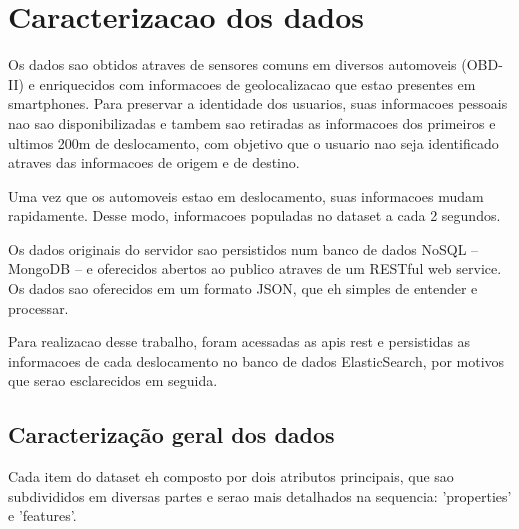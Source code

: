 \documentclass[10pt, conference]{IEEEtran}
\begin{document}
\section{Caracterizacao dos dados}
%

Os dados sao obtidos atraves de sensores comuns em diversos
automoveis (OBD-II) e enriquecidos com informacoes de geolocalizacao
que estao presentes em smartphones. Para preservar a identidade
dos usuarios, suas informacoes pessoais nao sao disponibilizadas e tambem
sao retiradas as informacoes dos primeiros e ultimos 200m de deslocamento,
com objetivo que o usuario nao seja identificado atraves das informacoes
de origem e de destino. 

Uma vez que os automoveis estao em deslocamento, suas informacoes mudam
rapidamente. Desse modo, informacoes populadas no dataset a cada 2 segundos.

Os dados originais do servidor sao persistidos num banco de dados NoSQL -- 
MongoDB -- e oferecidos abertos ao publico atraves de um RESTful web service.
Os dados sao oferecidos em um formato JSON, que eh simples de entender e processar.

Para realizacao desse trabalho, foram acessadas as apis rest e persistidas
as informacoes de cada deslocamento no banco de dados ElasticSearch, por 
motivos que serao esclarecidos em seguida. 



\subsection{Caracterização geral dos dados}

Cada item do dataset eh composto por dois atributos principais, que sao subdivididos
em diversas partes e serao mais detalhados na sequencia: 'properties' e 'features'. 
\end{document}
